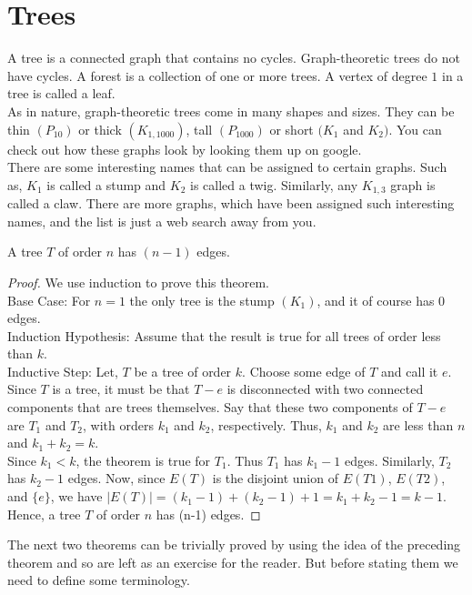 \chapter{Trees}

A tree is a connected graph that contains no cycles. Graph-theoretic trees do not have cycles. A forest is a collection of one or more trees. A vertex of degree $1$ in a tree is called a leaf.\\
As in nature, graph-theoretic trees come in many shapes and sizes. They can be thin $(P_{10})$ or thick $(K_{1,1000})$, tall $(P_{1000})$ or short $(K_{1}$ and $K_{2})$. You can check out how these graphs look by looking them up on google.\\
There are some interesting names that can be assigned to certain graphs. Such as, $K_{1}$ is called a stump and $K_{2}$ is called a twig. Similarly, any $K_{1,3}$ graph is called a claw. There are more graphs, which have been assigned such interesting names, and the list is just a web search away from you.
\begin{thm}
    A tree $T$ of order $n$ has $(n-1)$ edges. 
\end{thm}
\begin{proof}
    We use induction to prove this theorem.\\
    Base Case: For $n=1$ the only tree is the stump $(K_{1})$, and it of course has $0$ edges.\\
    Induction Hypothesis:  Assume that the result is true for all trees of order less than $k$.\\
    Inductive Step: Let, $T$ be a tree of order $k$. Choose some edge of $T$ and call it $e$. Since $T$ is a tree, it must be that $T-e$ is disconnected with two connected components that are trees themselves. Say that these two components of $T-e$ are $T_{1}$ and $T_{2}$, with orders $k_{1}$ and $k_{2}$, respectively. Thus, $k_{1}$ and $k_{2}$ are less than $n$ and $k_{1} + k_{2} = k$.\\
    Since $k_{1} < k$, the theorem is true for $T_{1}$. Thus $T_{1}$ has $k_{1}-1$ edges. Similarly, $T_{2}$ has $k_{2}-1$ edges. Now, since $E(T)$ is the disjoint union of $E(T1)$, $E(T2)$, and $\{e\}$, we have $|E(T)|=(k_{1}-1) + (k_{2}-1) + 1 = k_{1} + k_{2} - 1 = k-1$.\\
    Hence, a tree $T$ of order $n$ has (n-1) edges.
\end{proof}

The next two theorems can be trivially proved by using the idea of the preceding theorem and so are left as an exercise for the reader. But before stating them we need to define some terminology.

